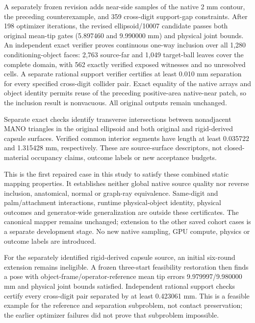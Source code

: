 \documentclass[10pt,letterpaper]{article}
\begin{document}
A separately frozen revision adds near-side samples of the native 2 mm
contour, the preceding counterexample, and 359 cross-digit support-gap
constraints. After 198 optimizer iterations, the revised ellipsoid/10007
candidate passes both original mean-tip gates (5.897460 and 9.990000 mm)
and physical joint bounds. An independent exact verifier proves continuous
one-way inclusion over all 1,280 conditioning-object faces: 2,763 source-far
and 1,049 target-ball leaves cover the complete domain, with 562 exactly
verified exposed witnesses and no unresolved cells. A separate rational
support verifier certifies at least 0.010 mm separation for every specified
cross-digit collider pair. Exact equality of the native arrays and object
identity permits reuse of the preceding positive-area native-near patch,
so the inclusion result is nonvacuous. All original outputs remain unchanged.

Separate exact checks identify transverse intersections between nonadjacent
MANO triangles in the original ellipsoid and both original and rigid-derived
capsule surfaces. Verified common interior segments have length at least
0.035722 and 1.315428 mm, respectively. These are source-surface descriptors,
not closed-material occupancy claims, outcome labels or new acceptance budgets.

This is the first repaired case in this study to satisfy these combined
static mapping properties. It establishes neither global native source quality
nor reverse inclusion, anatomical, normal or graph-ray equivalence.
Same-digit and palm/attachment interactions,
runtime physical-object identity, physical outcomes and generator-wide
generalization are outside these certificates. The canonical mapper remains
unchanged; extension to the other saved cohort cases is a separate development
stage. No new native sampling, GPU compute, physics or outcome labels are
introduced.

For the separately identified rigid-derived capsule source, an initial six-round
extension remains ineligible. A frozen three-start feasibility restoration then
finds a pose with object-frame/operator-reference mean tip errors
9.979997/9.980000 mm and physical joint bounds satisfied. Independent rational
support checks certify every cross-digit pair separated by at least 0.423061 mm.
This is a feasible example for the reference and separation subproblem, not
contact preservation; the earlier optimizer failures did not prove that
subproblem impossible.
\end{document}
